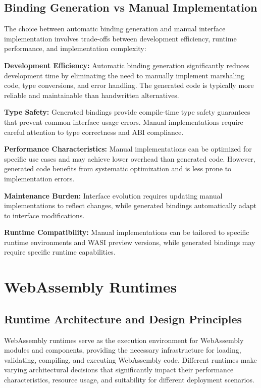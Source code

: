 \subsection{Binding Generation vs Manual Implementation}
\label{subsec:binding-comparison}

The choice between automatic binding generation and manual interface implementation involves trade-offs between development efficiency, runtime performance, and implementation complexity:

\textbf{Development Efficiency:} Automatic binding generation significantly reduces development time by eliminating the need to manually implement marshaling code, type conversions, and error handling. The generated code is typically more reliable and maintainable than handwritten alternatives.

\textbf{Type Safety:} Generated bindings provide compile-time type safety guarantees that prevent common interface usage errors. Manual implementations require careful attention to type correctness and ABI compliance.

\textbf{Performance Characteristics:} Manual implementations can be optimized for specific use cases and may achieve lower overhead than generated code. However, generated code benefits from systematic optimization and is less prone to implementation errors.

\textbf{Maintenance Burden:} Interface evolution requires updating manual implementations to reflect changes, while generated bindings automatically adapt to interface modifications.

\textbf{Runtime Compatibility:} Manual implementations can be tailored to specific runtime environments and WASI preview versions, while generated bindings may require specific runtime capabilities.

\section{WebAssembly Runtimes}
\label{sec:wasm-runtimes}

\subsection{Runtime Architecture and Design Principles}
\label{subsec:runtime-architecture}

WebAssembly runtimes serve as the execution environment for WebAssembly modules and components, providing the necessary infrastructure for loading, validating, compiling, and executing WebAssembly code. Different runtimes make varying architectural decisions that significantly impact their performance characteristics, resource usage, and suitability for different deployment scenarios.

